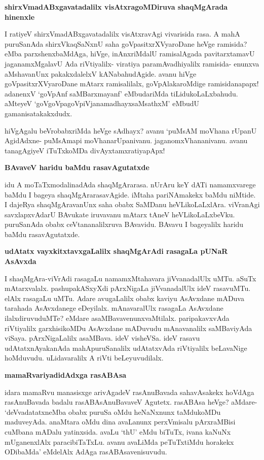 {\bigskip
\noindent
{\large\bf shirxVmadABxgavatadalilx visAtxragoMDiruva shaqMgArada hinenxle}}
\medskip

\noindent
I ratiyeV shirxVmadABxgavatadalilx visAtxravAgi vivarisida rasa. A mahA puruSanAda shirxVkaqSaNxnU saha goVpasitxrXVyaroDane heVge ramisida? eMba parxshenxbaMdAga, hiVge, inAnxriMdalU ramisalAgada pavitarxtamavU jaganamxMgalavU Ada riVtiyalilx- viratiya paramAvadhiyalilx ramisida- enunxva aMshavanUnx pakakxdalelxV kANabahudAgide. avanu hiVge goVpasitxrXVyaroDane mAtarx ramisalilalx, goVpAlakaroMdige ramisidanapapx! adanenxV `goVpAnf saMBarxmayanf'\label{229} eMbudariMda tiLidukoLaLxbahudu. aMteyeV `goVgoVpagoVpiVjanamadhayxsaMsathxM'\label{229a} eMbudU gamanisatakakxdudx.

hiVgAgalu beVrobabxriMda heVge sAdhayx? avanu `puMsAM moVhana rUpanU AgidAdxne- puMsAmapi moVhanarUpanivanu. jaganomxVhananivanu. avanu tanagAgiyeV iTuTxkoMDa divAyxtamxratiyapApx!

{\bigskip
\noindent
{\large\bf BAvaveV haridu baMdu rasavAgutatxde}}\label{page229}
\medskip

\noindent
idu A moTaTxmodalinadAda shaqMgArarasa. nUrAru keY dATi namamxvarege baMdu I bageya shaqMgArarasavAgide. iMtaha pariNAmakekx baMdu niMtide. I dajeRya shaqMgAravanUnx saha obabx SaMDanu heVLikoLaLxlAra. viVranAgi savxlapxvAdarU BAvukate iruvavanu mAtarx tAneV heVLikoLaLxbeVku. puruSanAda obabx ceVtananalilxruva BAvavidu. BAvavu I bageyalilx haridu baMdu rasavAgutatxde.

{\bigskip
\noindent
{\large\bf udAtatx vayxkitxtavxgaLalilx shaqMgArAdi rasagaLa pUNaR AsAvxda}}\label{page229a}
\medskip

\noindent
I shaqMgAra-viVrAdi rasagaLu namamxMtahavara jiVvanadalUlx uMTu. aSuTx mAtarxvalalx. pashupakASxyXdi pArxNigaLa jiVvanadalUlx ideV rasavuMTu. elAlx rasagaLu uMTu. Adare avugaLalilx obabx kaviyu AsAvxdane mADuva tarahada AsAvxdanege eDeyilalx. mAnavaralUlx rasagaLa AsAvxdane ilalxdiruvuduMTe? eMdare asaMBavavenunxvaMtilalx. paripakavxvAda riVtiyalilx garxhisikoMDu AsAvxdane mADuvudu mAnavanalilx saMBaviyAda viSaya. pArxNigaLalilx asaMBava. ideV visheVSa. ideV rasavu udAtatxnAyakanAda mahApuruSanalilx udAtatxvAda riVtiyalilx beLavaNige hoMduvudu. uLidavaralilx A riVti beLeyuvudilalx.

{\bigskip
\noindent
{\large\bf mamaRvariyadidAdxga rasABAsa}}\label{page229b}
\medskip

\noindent
idara mamaRvu manasisxge arivAgadeV rasAnuBavada sahavAsakekx hoVdAga rasAnuBavada badalu rasABAsAnuBavaveV Agutetx. rasABAsa heVge? aMdare- `deVvadatatxneMba obabx puruSa oMdu heNaNxnunx taMdukoMDu maduveyAda. anaMtara oMdu dina avaLanunx perxVmisalu pArxraMBisi cuMbana mADalu yatinxsida. avaLu `thU' eMdu biTuTx, ivana kaNuNx mUganenxlAlx paracibiTaTxLu. avanu avaLiMda peTuTxtiMdu horakekx ODibaMda' eMdelAlx AdAga rasABAsavenisuvudu.

